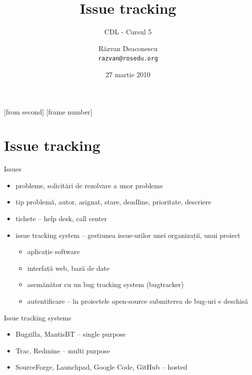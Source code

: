 \documentclass{beamer}
\title[Issue tracking]{Issue tracking}
\subtitle{CDL - Cursul 5}
\institute[ROSEdu]{ROSEdu}
\date{27 martie 2010}
\author{Răzvan Deaconescu \\ \texttt{razvan@rosedu.org}}
\begin{document}
[from second]
[frame number]

\frame{\titlepage}

\frame{\tableofcontents}


\section{Issue tracking}

\frame{\tableofcontents[currentsection]}


\begin{frame}{Issues}
  \begin{itemize}
    \item probleme, solicitări de rezolvare a unor probleme
    \item tip problemă, autor, asignat, stare, deadline, prioritate,
descriere
    \item tichete -- help desk, call center
    \item issue tracking system -- gestiunea issue-urilor unei
organizații, unui proiect
      \begin{itemize}
        \item aplicație software
        \item interfață web, bază de date
        \item asemănător cu un bug tracking system (bugtracker)
        \item autentificare -- în proiectele open-source submiterea de
bug-uri e deschisă
      \end{itemize}
  \end{itemize}
\end{frame}

\begin{frame}{Issue tracking systems}
  \begin{itemize}
    \item Bugzilla, MantisBT -- single purpose
    \item Trac, Redmine -- multi purpose
    \item SourceForge, Launchpad, Google Code, GitHub -- hosted
  \end{itemize}
\end{frame}
\end{document}
